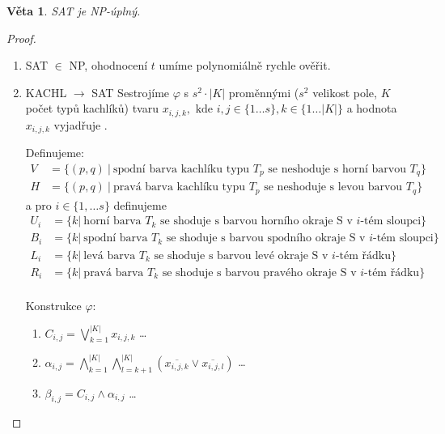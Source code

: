 \documentclass[11pt]{report} %
\newtheorem{theorem}{Věta}[section]
\numberwithin{equation}{section}
\begin{document}
\begin{theorem}
SAT je NP-úplný.
\end{theorem}
\begin{proof}
\begin{enumerate}
	
	
	\item SAT $\in$ NP, ohodnocení $t$ umíme polynomiálně rychle ověřit.
	
	\item KACHL $\rightarrow$ SAT
	Sestrojíme $\varphi$ s $s^2 \cdot |K|$ proměnnými ($s^2$ velikost pole, $K$ počet typů kachlíků) tvaru $x_{i,j,k}, \text{ kde } i,j \in \{1\dots s\}, k \in \{1\dots|K|\} $ a hodnota $x_{i,j,k}$ vyjadřuje .
	
	Definujeme:
	\begin{align*}
		V &= \{(p,q)\ |\ \text{spodní barva kachlíku typu $T_p$ se neshoduje s horní barvou $T_q$} \}\\
		H &= \{(p,q)\ |\ \text{pravá barva kachlíku typu $T_p$ se neshoduje s levou barvou $T_q$} \}		
	\end{align*}
	a pro $i \in \{1, \dots s\}$ definujeme
	\begin{align*}
		U_i &= \{k |\ \text{horní barva $T_k$ se shoduje s barvou horního okraje S v $i$-tém sloupci} \}\\
		B_i &= \{k |\ \text{spodní barva $T_k$ se shoduje s barvou spodního okraje S v $i$-tém sloupci} \}\\
		L_i &= \{k |\ \text{levá barva $T_k$ se shoduje s barvou levé okraje S v $i$-tém řádku} \}\\
		R_i &= \{k |\ \text{pravá barva $T_k$ se shoduje s barvou pravého okraje S v $i$-tém řádku} \}\\
	\end{align*}

	Konstrukce $\varphi$:
	\begin{enumerate}
		
		\item $C_{i,j} = \bigvee\limits_{k=1}^{|K|} x_{i,j,k}$ \quad\dots\quad {}
		
		\item $\alpha_{i,j} = \bigwedge\limits_{k=1}^{|K|}\bigwedge\limits_{l=k+1}^{|K|} (\overline{x_{i,j,k}} \vee \overline{x_{i,j,l}})$ \quad\dots\quad {}
		
		\item $\beta_{i,j} = C_{i,j} \wedge \alpha_{i,j}$ \quad\dots\quad {}
		

\end{enumerate}
\end{enumerate}
\end{proof}
\end{document}
